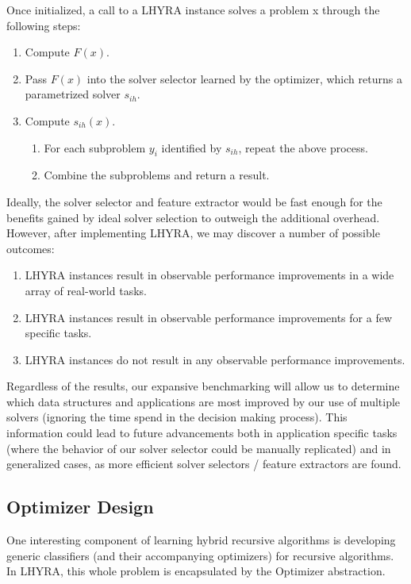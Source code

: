 \documentclass{article}
\begin{document}
Once initialized, a call to a LHYRA instance solves a problem x through the following steps:

\begin{enumerate}
	\item Compute $F(x)$.
	\item Pass $F(x)$ into the solver selector learned by the optimizer, which returns a parametrized solver $s_{ih}$.
	\item Compute $s_{ih}(x)$.
	\begin{enumerate}
		\item For each subproblem $y_i$ identified by $s_{ih}$, repeat the above process.
		\item Combine the subproblems and return a result.
	\end{enumerate}
\end{enumerate}

Ideally, the solver selector and feature extractor would be fast enough for the benefits gained by ideal solver selection to outweigh the additional overhead. However, after implementing LHYRA, we may discover a number of possible outcomes:

\begin{enumerate}
	\item LHYRA instances result in observable performance improvements in a wide array of real-world tasks.
	\item LHYRA instances result in observable performance improvements for a few specific tasks.
	\item LHYRA instances do not result in any observable performance improvements.
\end{enumerate}

Regardless of the results, our expansive benchmarking will allow us to determine which data structures and applications are most improved by our use of multiple solvers (ignoring the time spend in the decision making process). This information could lead to future advancements both in application specific tasks (where the behavior of our solver selector could be manually replicated) and in generalized cases, as more efficient solver selectors / feature extractors are found.

\subsection*{Optimizer Design}

One interesting component of learning hybrid recursive algorithms is developing generic classifiers (and their accompanying optimizers) for recursive algorithms.  In LHYRA, this whole problem is encapsulated by the Optimizer abstraction.
\end{document}
